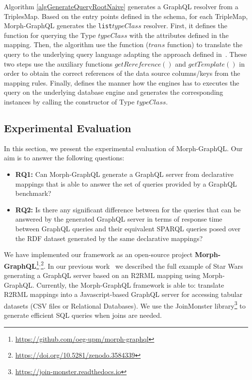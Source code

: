 Algorithm \ref{algGenerateQueryRootNaive} generates a GraphQL resolver from a TriplesMap. Based on the entry points defined in the schema, for each TripleMap, Morph-GraphQL generates the \texttt{list$typeClass$} resolver. First, it defines the function for querying the Type $typeClass$ with the attributes defined in the mapping. Then, the algorithm use the function ($trans$ function) to translate the query to the underlying query language adapting the approach defined in~\citep{chebotko2009semantics}. These two steps use the auxiliary functions $getRereference()$ and $getTemplate()$ in order to obtain the correct references of the data source columns/keys from the mapping rules. Finally, defines the manner how the engines has to executes the query on the underlying database engine and generates the corresponding instances by calling the constructor of Type $typeClass$.




\subsection{Experimental Evaluation}
In this section, we present the experimental evaluation of Morph-GraphQL. Our aim is to answer the following questions:
\begin{itemize}
    \item \textbf{RQ1:} Can Morph-GraphQL generate a GraphQL server from declarative mappings that is able to answer the set of queries provided by a GraphQL benchmark?
    \item \textbf{RQ2:} Is there any significant difference between for the queries that can be answered by the generated GraphQL server in terms of response time between GraphQL queries and their equivalent SPARQL queries posed over the RDF dataset generated by the same declarative mappings?
\end{itemize}

We have implemented our framework as an open-source project \textbf{Morph-GraphQL}\footnote{\url{https://github.com/oeg-upm/morph-graphql}}$^,$\footnote{\url{https://doi.org/10.5281/zenodo.3584339}}. In our previous work~\citep{priyatna2019morph} we described the full example of Star Wars generating a GraphQL server based on an R2RML mapping using Morph-GraphQL. Currently, the Morph-GraphQL framework is able to: translate R2RML mappings into a Javascript-based GraphQL server for accessing tabular datasets (CSV files or Relational Databases)\citep{priyatna2019morph}. We use the JoinMonster library\footnote{\url{https://join-monster.readthedocs.io}} to generate efficient SQL queries when joins are needed.


